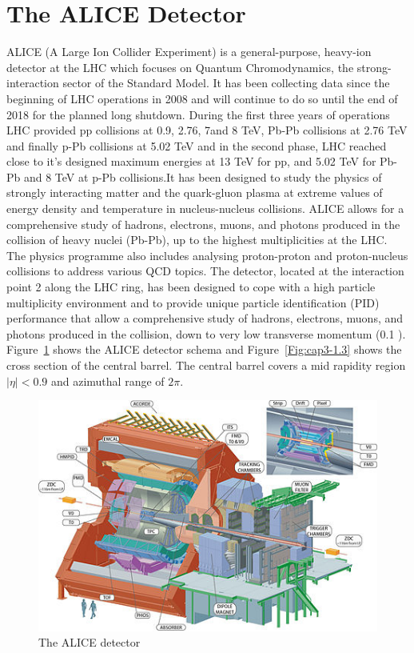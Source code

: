 \section{The ALICE Detector}
\label{par:3.2}
ALICE (A Large Ion Collider Experiment) is a general-purpose, heavy-ion detector at the LHC which focuses on Quantum Chromodynamics, the strong-interaction sector of the Standard Model. It has been collecting data since the beginning of LHC operations in 2008 and will continue to do so until the end of 2018 for the planned long shutdown. During the first three years of operations LHC provided pp collisions at 0.9, 2.76, 7and 8 TeV, Pb-Pb collisions at 2.76 TeV and finally p-Pb collisions at 5.02 TeV and in the second phase, LHC reached close to it's designed maximum energies at 13 TeV for pp, and 5.02 TeV for Pb-Pb and 8 TeV at p-Pb collisions.It has been designed to study the physics of strongly interacting matter and the quark-gluon plasma at extreme values of energy density and temperature in nucleus-nucleus collisions. ALICE allows for a comprehensive study of hadrons, electrons, muons, and photons produced in the collision of heavy nuclei (Pb-Pb), up to the highest multiplicities at the LHC. The physics programme also includes analysing proton-proton and proton-nucleus collisions to address various QCD topics. The detector, located at the interaction point 2 along the LHC ring, has been designed to cope with a high particle multiplicity environment and to provide unique particle identification (PID) performance that allow a comprehensive study of hadrons, electrons, muons, and photons produced in the collision, down to very low transverse momentum (0.1 \GeVc). \mbox{Figure \ref{Fig:cap3-1.2}} shows the ALICE detector schema and \mbox{Figure \ref{Fig:cap3-1.3}} shows the cross section of the central barrel. The central barrel covers a mid rapidity region $|\eta| < 0.9$ and azimuthal range of $2\pi$. 

\begin{figure}[t]
\centering
\includegraphics[width=1.0\textwidth]{Images/Chapter3/detALICE}
\caption[The ALICE detector]{The ALICE detector}
\label{Fig:cap3-1.2}
\end{figure}


